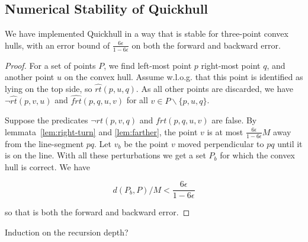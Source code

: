 \subsection{Numerical Stability of Quickhull}

\begin{theorem}
    We have implemented Quickhull in a way that is stable for three-point
    convex hulls, with an error bound of $\frac{6\epsilon}{1 - 6\epsilon}$
    on both the forward and backward error.
\end{theorem}

\begin{proof}
    For a set of points $P$, we find left-most point $p$ right-most point $q$,
    and another point $u$ on the convex hull. Assume w.l.o.g. that this point
    is identified as lying on the top side, so $\hat{rt}(p, u, q)$. 
    As all other points are discarded, we have $\neg\hat{rt}(p, v, u)$ and
    $\hat{frt}(p, q, u, v)$ for all $v \in P \backslash \{p, u, q\}$.

    Suppose the predicates $\neg rt(p, v, q)$ and $frt(p, q, u, v)$ are false.
    By lemmata~\ref{lem:right-turn} and \ref{lem:farther}, the point $v$
    is at most $\frac{6 \epsilon}{1 - 6\epsilon}M$ away from the line-segment
    $pq$. Let $v_b$ be the point $v$ moved perpendicular to $pq$ until it is
    on the line. With all these perturbations we get a set $P_b$ for which
    the convex hull is correct. We have

    $$d(P_b, P) / M < \frac{6 \epsilon}{1 - 6 \epsilon}$$

    so that is both the forward and backward error. 
\end{proof}

Induction on the recursion depth?
